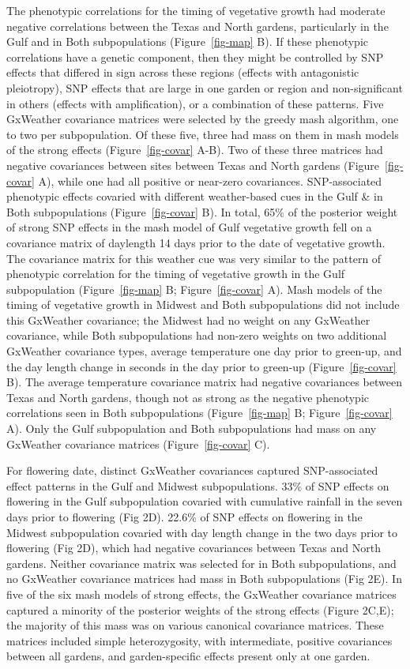 \documentclass[
  9pt,
  twocolumn,
  twoside]{pnas-new}
\begin{document}
The phenotypic correlations for the timing of vegetative growth had
moderate negative correlations between the Texas and North gardens,
particularly in the Gulf and in Both subpopulations
(Figure~\ref{fig-map} B). If these phenotypic correlations have a
genetic component, then they might be controlled by SNP effects that
differed in sign across these regions (effects with antagonistic
pleiotropy), SNP effects that are large in one garden or region and
non-significant in others (effects with amplification), or a combination
of these patterns. Five GxWeather covariance matrices were selected by
the greedy mash algorithm, one to two per subpopulation. Of these five,
three had mass on them in mash models of the strong effects
(Figure~\ref{fig-covar} A-B). Two of these three matrices had negative
covariances between sites between Texas and North gardens
(Figure~\ref{fig-covar} A), while one had all positive or near-zero
covariances. SNP-associated phenotypic effects covaried with different
weather-based cues in the Gulf \& in Both subpopulations
(Figure~\ref{fig-covar} B). In total, 65\% of the posterior weight of
strong SNP effects in the mash model of Gulf vegetative growth fell on a
covariance matrix of daylength 14 days prior to the date of vegetative
growth. The covariance matrix for this weather cue was very similar to
the pattern of phenotypic correlation for the timing of vegetative
growth in the Gulf subpopulation (Figure~\ref{fig-map} B;
Figure~\ref{fig-covar} A). Mash models of the timing of vegetative
growth in Midwest and Both subpopulations did not include this GxWeather
covariance; the Midwest had no weight on any GxWeather covariance, while
Both subpopulations had non-zero weights on two additional GxWeather
covariance types, average temperature one day prior to green-up, and the
day length change in seconds in the day prior to green-up
(Figure~\ref{fig-covar} B). The average temperature covariance matrix
had negative covariances between Texas and North gardens, though not as
strong as the negative phenotypic correlations seen in Both
subpopulations (Figure~\ref{fig-map} B; Figure~\ref{fig-covar} A). Only
the Gulf subpopulation and Both subpopulations had mass on any GxWeather
covariance matrices (Figure~\ref{fig-covar} C).

For flowering date, distinct GxWeather covariances captured
SNP-associated effect patterns in the Gulf and Midwest subpopulations.
33\% of SNP effects on flowering in the Gulf subpopulation covaried with
cumulative rainfall in the seven days prior to flowering (Fig 2D).
22.6\% of SNP effects on flowering in the Midwest subpopulation covaried
with day length change in the two days prior to flowering (Fig 2D),
which had negative covariances between Texas and North gardens. Neither
covariance matrix was selected for in Both subpopulations, and no
GxWeather covariance matrices had mass in Both subpopulations (Fig 2E).
In five of the six mash models of strong effects, the GxWeather
covariance matrices captured a minority of the posterior weights of the
strong effects (Figure 2C,E); the majority of this mass was on various
canonical covariance matrices. These matrices included simple
heterozygosity, with intermediate, positive covariances between all
gardens, and garden-specific effects present only at one garden.
\end{document}
